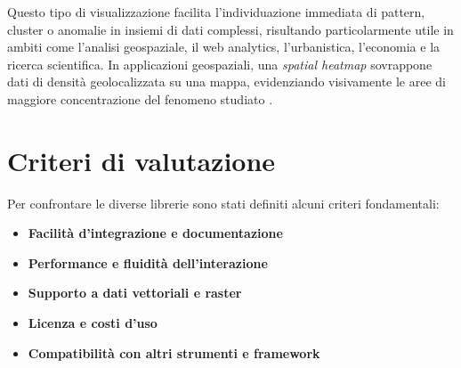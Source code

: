 Questo tipo di visualizzazione facilita l'individuazione immediata di pattern, cluster o anomalie in insiemi di dati complessi, risultando particolarmente utile in ambiti come l'analisi geospaziale, il web analytics, l'urbanistica, l'economia e la ricerca scientifica. In applicazioni geospaziali, una \emph{spatial heatmap} sovrappone dati di densità geolocalizzata su una mappa, evidenziando visivamente le aree di maggiore concentrazione del fenomeno studiato \cite{vwo-heatmap,heatmap-wikipedia,clarity-heatmap}.


\section{Criteri di valutazione}
Per confrontare le diverse librerie sono stati definiti alcuni criteri fondamentali:
\begin{itemize}
  \item \textbf{Facilità d'integrazione e documentazione}
  \item \textbf{Performance e fluidità dell'interazione}
  \item \textbf{Supporto a dati vettoriali e raster}
  \item \textbf{Licenza e costi d'uso}
  \item \textbf{Compatibilità con altri strumenti e framework}
\end{itemize}






